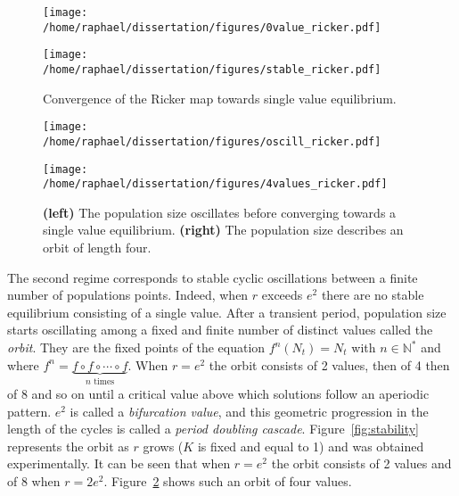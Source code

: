 \documentclass[12pt]{article}
\begin{document}
	\begin{figure}[htb]
		\centering
		\vspace{5mm}
		\begin{minipage}{0.49\textwidth}
			\centering
			\texttt{[image: /home/raphael/dissertation/figures/0value\_ricker.pdf]}
		\end{minipage}
		\begin{minipage}{0.49\textwidth}
			\centering
			\texttt{[image: /home/raphael/dissertation/figures/stable\_ricker.pdf]}
		\end{minipage}
		\caption{Convergence of the Ricker map towards single value equilibrium.}
		\vspace{5mm}
		\label{fig:stab}
	\end{figure}
	
	\begin{figure}[htb]
		\centering
		\vspace{5mm}
		\begin{minipage}{0.49\textwidth}
			\centering
			\texttt{[image: /home/raphael/dissertation/figures/oscill\_ricker.pdf]}
		\end{minipage}
		\begin{minipage}{0.49\textwidth}
			\centering
			\texttt{[image: /home/raphael/dissertation/figures/4values\_ricker.pdf]}
		\end{minipage}
		\caption[Examples of oscillation and orbit of the Ricker map.]{\textbf{(left)} The population size oscillates before converging towards a single value equilibrium. \textbf{(right)} The population size describes an orbit of length four.}
		\vspace{5mm}
		\label{fig:oscill}
	\end{figure}
	
	The second regime corresponds to stable cyclic oscillations between a finite number of populations points. Indeed, when $r$ exceeds $e^2$ there are no stable equilibrium consisting of a single value. After a transient period, population size starts oscillating among a fixed and finite number of distinct values called the \emph{orbit}. They are the fixed points of the equation $f^n(N_t) = N_t$ with $n \in \mathbb{N^*}$ and where $f^n = \underbrace{f\circ f\circ \cdots \circ f}_{n\text{\ times}}$. When $r=e^2$ the orbit consists of 2 values, then of 4 then of 8 and so on until a critical value above which solutions follow an aperiodic pattern. $e^2$ is called a \emph{bifurcation value}, and this geometric progression in the length of the cycles is called a \emph{period doubling cascade}. Figure~\ref{fig:stability} represents the orbit as $r$ grows ($K$ is fixed and equal to 1) and was obtained experimentally. It can be seen that when $r=e^2$ the orbit consists of 2 values and of 8 when $r=2e^2$. Figure~\ref{fig:oscill} shows such an orbit of four values.
	
\end{document}
